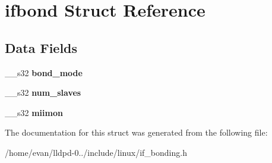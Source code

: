 \section{ifbond \-Struct \-Reference}
\label{structifbond}
\subsection*{\-Data \-Fields}
\begin{DoxyCompactItemize}
\item 
\-\_\-\-\_\-s32 {\bfseries bond\-\_\-mode}\label{structifbond_a0be72e56c6ace60dd96996cd8d42a423}

\item 
\-\_\-\-\_\-s32 {\bfseries num\-\_\-slaves}\label{structifbond_a32188b1dcf996f0dfbcff85eb82c8d76}

\item 
\-\_\-\-\_\-s32 {\bfseries miimon}\label{structifbond_a08afd8316e5b274a365f4a7c27320cca}

\end{DoxyCompactItemize}


\-The documentation for this struct was generated from the following file\-:\begin{DoxyCompactItemize}
\item 
/home/evan/lldpd-\/0../include/linux/if\-\_\-bonding.\-h\end{DoxyCompactItemize}
